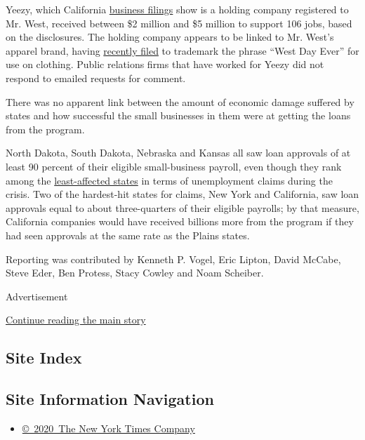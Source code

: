 Yeezy, which California
\href{https://businesssearch.sos.ca.gov/Document/RetrievePDF?Id=201613910148-27294586}{business
filings} show is a holding company registered to Mr. West, received
between \$2 million and \$5 million to support 106 jobs, based on the
disclosures. The holding company appears to be linked to Mr. West's
apparel brand, having
\href{https://tsdr.uspto.gov/documentviewer?caseId=sn90023673\&docId=APP20200630084733\#docIndex=1\&page=1}{recently
filed} to trademark the phrase ``West Day Ever'' for use on clothing.
Public relations firms that have worked for Yeezy did not respond to
emailed requests for comment.

There was no apparent link between the amount of economic damage
suffered by states and how successful the small businesses in them were
at getting the loans from the program.

North Dakota, South Dakota, Nebraska and Kansas all saw loan approvals
of at least 90 percent of their eligible small-business payroll, even
though they rank among the
\href{https://taxfoundation.org/unemployment-insurance-claims/}{least-affected
states} in terms of unemployment claims during the crisis. Two of the
hardest-hit states for claims, New York and California, saw loan
approvals equal to about three-quarters of their eligible payrolls; by
that measure, California companies would have received billions more
from the program if they had seen approvals at the same rate as the
Plains states.

Reporting was contributed by Kenneth P. Vogel, Eric Lipton, David
McCabe, Steve Eder, Ben Protess, Stacy Cowley and Noam Scheiber.

Advertisement

\protect\hyperlink{after-bottom}{Continue reading the main story}

\hypertarget{site-index}{%
\subsection{Site Index}\label{site-index}}

\hypertarget{site-information-navigation}{%
\subsection{Site Information
Navigation}\label{site-information-navigation}}

\begin{itemize}
\tightlist
\item
  \href{https://help.nytimes.com/hc/en-us/articles/115014792127-Copyright-notice}{©~2020~The
  New York Times Company}
\end{itemize}

